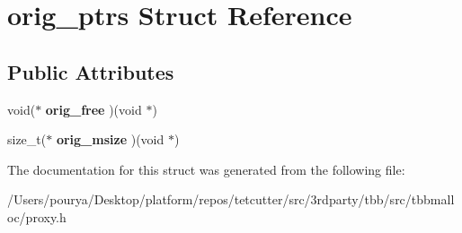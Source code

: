 \hypertarget{structorig__ptrs}{}\section{orig\+\_\+ptrs Struct Reference}
\label{structorig__ptrs}
\subsection*{Public Attributes}
\begin{DoxyCompactItemize}
\item 
\hypertarget{structorig__ptrs_a8150d5a4f90933d5bbfc53a5a2e7bb2e}{}void($\ast$ {\bfseries orig\+\_\+free} )(void $\ast$)\label{structorig__ptrs_a8150d5a4f90933d5bbfc53a5a2e7bb2e}

\item 
\hypertarget{structorig__ptrs_a5b650a3290cbfdd03deeb4effa75bc6b}{}size\+\_\+t($\ast$ {\bfseries orig\+\_\+msize} )(void $\ast$)\label{structorig__ptrs_a5b650a3290cbfdd03deeb4effa75bc6b}

\end{DoxyCompactItemize}


The documentation for this struct was generated from the following file\+:\begin{DoxyCompactItemize}
\item 
/\+Users/pourya/\+Desktop/platform/repos/tetcutter/src/3rdparty/tbb/src/tbbmalloc/proxy.\+h\end{DoxyCompactItemize}
